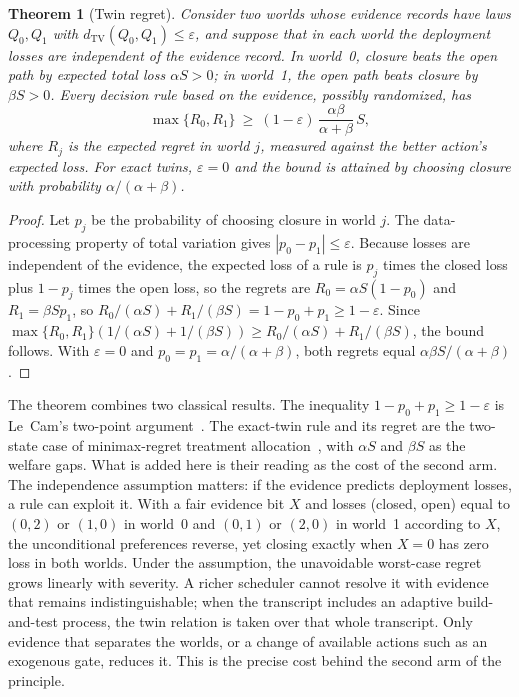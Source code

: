 \documentclass[11pt]{article}
\newtheorem{theorem}{Theorem}
\theoremstyle{definition}
\theoremstyle{remark}
\newcommand{\TV}{d_{\mathrm{TV}}}
\begin{document}
\begin{theorem}[Twin regret]\label{thm:regret}
Consider two worlds whose evidence records have laws $Q_0,Q_1$ with $\TV(Q_0,Q_1)\le\varepsilon$, and
suppose that in each world the deployment losses are independent of the evidence record. In world~0,
closure beats the open path by expected total loss $\alpha S>0$; in world~1, the open path beats
closure by $\beta S>0$. Every decision rule based on the evidence, possibly randomized, has
\[
\max\{R_0,R_1\}\ \ge\ (1-\varepsilon)\,\frac{\alpha\beta}{\alpha+\beta}\,S,
\]
where $R_j$ is the expected regret in world $j$, measured against the better action's expected loss. For exact twins, $\varepsilon=0$ and the bound is
attained by choosing closure with probability $\alpha/(\alpha+\beta)$.
\end{theorem}
\begin{proof}
Let $p_j$ be the probability of choosing closure in world $j$. The data-processing property of total
variation gives $|p_0-p_1|\le\varepsilon$. Because losses are independent of the evidence, the expected
loss of a rule is $p_j$ times the closed loss plus $1-p_j$ times the open loss, so the regrets are $R_0=\alpha S(1-p_0)$ and $R_1=\beta Sp_1$,
so $R_0/(\alpha S)+R_1/(\beta S)=1-p_0+p_1\ge1-\varepsilon$. Since
$\max\{R_0,R_1\}(1/(\alpha S)+1/(\beta S))\ge R_0/(\alpha S)+R_1/(\beta S)$, the bound follows. With
$\varepsilon=0$ and $p_0=p_1=\alpha/(\alpha+\beta)$, both regrets equal $\alpha\beta S/(\alpha+\beta)$.
\end{proof}
The theorem combines two classical results. The inequality $1-p_0+p_1\ge1-\varepsilon$ is Le~Cam's
two-point argument~\cite{lecam73}. The exact-twin rule and its regret are the two-state case of
minimax-regret treatment allocation~\cite{manski05,manski09}, with $\alpha S$ and $\beta S$ as the
welfare gaps. What is added here is their reading as the cost of the second arm.
The independence assumption matters: if the evidence predicts deployment losses, a rule can exploit
it. With a fair evidence bit $X$ and losses (closed, open) equal to $(0,2)$ or $(1,0)$ in world~0 and
$(0,1)$ or $(2,0)$ in world~1 according to $X$, the unconditional preferences reverse, yet closing
exactly when $X=0$ has zero loss in both worlds. Under the assumption, the unavoidable worst-case regret
grows linearly with severity. A richer scheduler cannot resolve
it with evidence that remains indistinguishable; when the transcript includes an adaptive
build-and-test process, the twin relation is taken over that whole transcript. Only evidence that
separates the worlds, or a change of available actions such as an exogenous gate, reduces it. This
is the precise cost behind the second arm of the principle.
\end{document}
